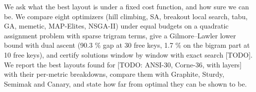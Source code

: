\documentclass{gecko-paper}
\begin{document}
\makepapertitle
\begin{paperabstract}
We ask what the best layout is under a fixed cost function, and how sure
we can be. We compare eight optimizers (hill climbing, SA, breakout
local search, tabu, GA, memetic, MAP-Elites, NSGA-II) under equal
budgets on a quadratic assignment problem with sparse trigram terms,
give a Gilmore–Lawler lower bound with dual ascent (90.3 \% gap at 30
free keys, 1.7 \% on the bigram part at 10 free keys), and certify
solutions window by window with exact search {[}TODO{]}. We report the
best layouts found for {[}TODO: ANSI-30, Corne-36, with layers{]} with
their per-metric breakdowns, compare them with Graphite, Sturdy, Semimak
and Canary, and state how far from optimal they can be shown to be.

\end{paperabstract}
\end{document}
